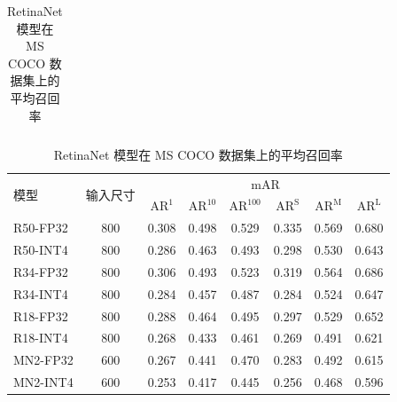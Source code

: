 \documentclass[
  fontset = mac,
]{shtthesis}
\begin{document}
\begin{table}[p]
\begin{subtable}[t]{\columnwidth}
\begin{tabular}{lc*{6}{c}}
      \bottomrule
    \end{tabular}
  \end{subtable}
  \newline
  \vspace*{0.5 cm}
  \newline
  \begin{subtable}[t]{\columnwidth}
    \centering
    \caption{RetinaNet 模型在 MS COCO 数据集上的平均召回率}
    \label{tab::fqn::retina_coco_mAR}
    \begin{tabular}{lc*{6}{c}}
      \toprule
      \multirow{2}{*}{模型} & \multirow{2}{*}{输入尺寸} & \multicolumn{6}{c}{mAR} \\
      & & $\mathrm{AR}^{1}$ & $\mathrm{AR}^{10}$ & $\mathrm{AR}^{100}$ &
      $\mathrm{AR} ^ {\mathrm{S}}$ & $\mathrm{AR} ^ {\mathrm{M}}$ & $\mathrm{AR} ^ {\mathrm{L}}$ \\
      \midrule
      R50-FP32 & 800 &0.308 &0.498 &0.529 &0.335 &0.569 &0.680 \\
      R50-INT4 & 800 &0.286 &0.463 &0.493 &0.298 &0.530 &0.643 \\
      \hdashline
      R34-FP32 & 800 &0.306 &0.493 &0.523 &0.319 &0.564 &0.686 \\
      R34-INT4 & 800 &0.284 &0.457 &0.487 &0.284 &0.524 &0.647 \\
      \hdashline
      R18-FP32 & 800 &0.288 &0.464 &0.495 &0.297 &0.529 &0.652 \\
      R18-INT4 & 800 &0.268 &0.433 &0.461 &0.269 &0.491 &0.621 \\
      \hdashline
      MN2-FP32 & 600 &0.267 &0.441 &0.470 &0.283 &0.492 &0.615 \\
      MN2-INT4 & 600 &0.253 &0.417 &0.445 &0.256 &0.468 &0.596 \\
      \bottomrule
    \end{tabular}
  \end{subtable}
\end{table}
\end{document}
